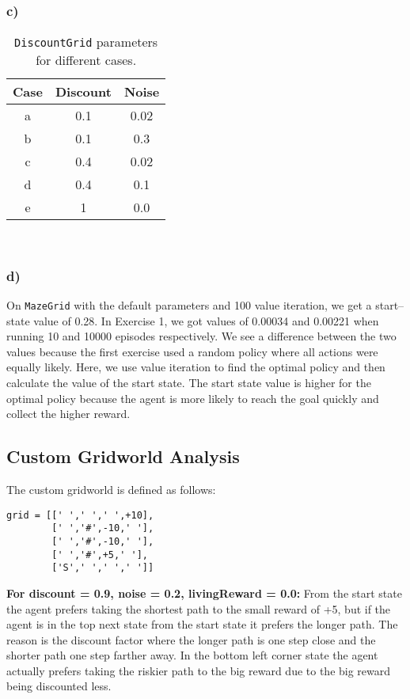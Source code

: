 \documentclass[11pt]{article}
\begin{document}
\subsubsection*{c)}

\begin{table}[H]
\centering
\begin{tabular}{|c|c|c|}
\hline
\textbf{Case} & \textbf{Discount} & \textbf{Noise} \\ \hline
a & 0.1 & 0.02 \\ \hline
b & 0.1 & 0.3 \\ \hline
c & 0.4 & 0.02 \\ \hline
d & 0.4 & 0.1 \\ \hline
e & 1 & 0.0 \\ \hline

\end{tabular}
\caption{\texttt{DiscountGrid} parameters for different cases.}
\end{table}

\

\subsubsection*{d)} On \texttt{MazeGrid} with the default parameters and 100 value iteration, we get a start--state value of 0.28. In Exercise 1, we got values of 0.00034 and 0.00221 when running 10 and 10000 episodes respectively. We see a difference between the two values because the first exercise used a random policy where all actions were equally likely. Here, we use value iteration to find the optimal policy and then calculate the value of the start state. The start state value is higher for the optimal policy because the agent is more likely to reach the goal quickly and collect the higher reward.

\subsection{Custom Gridworld Analysis}
The custom gridworld is defined as follows:

\begin{verbatim}
grid = [[' ',' ',' ',+10],
        [' ','#',-10,' '],
        [' ','#',-10,' '],
        [' ','#',+5,' '],
        ['S',' ',' ',' ']]
\end{verbatim}

\noindent \textbf{For discount = 0.9, noise = 0.2, livingReward = 0.0:} From the start state the agent prefers taking the shortest path to the small reward of +5, but if the agent is in the top next state from the start state it prefers the longer path. The reason is the discount factor where the longer path is one step close and the shorter path one step farther away. In the bottom left corner state the agent actually prefers taking the riskier path to the big reward due to the big reward being discounted
less.
\end{document}
